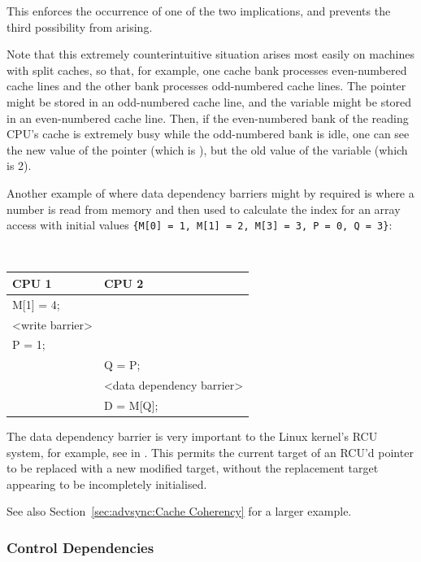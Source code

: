 This enforces the occurrence of one of the two implications, and prevents the
third possibility from arising.

Note that this extremely counterintuitive situation arises most easily on
machines with split caches, so that, for example, one cache bank processes
even-numbered cache lines and the other bank processes odd-numbered cache
lines.
The pointer  might be stored in an odd-numbered cache line, and the
variable  might be stored in an even-numbered cache line.  Then, if the
even-numbered bank of the reading CPU's cache is extremely busy while the
odd-numbered bank is idle, one can see the new value of the
pointer  (which is ),
but the old value of the variable  (which is 2).

Another example of where data dependency barriers might by required is where a
number is read from memory and then used to calculate the index for an array
access with initial values
{\tt \{M[0] = 1, M[1] = 2, M[3] = 3, P = 0, Q = 3\}}:

\vspace{5pt}
\begin{minipage}[t]{\columnwidth}
\tt
\scriptsize
\begin{tabular}{l|p{1.5in}}
	CPU 1 &		CPU 2 \\
	\hline
	M[1] = 4; & \\
	<write barrier> & \\
	P = 1;	&	\\
		&	Q = P; \\
		&	<data dependency barrier> \\
		&	D = M[Q]; \\
\end{tabular}
\end{minipage}
\vspace{5pt}

The data dependency barrier is very important to the Linux kernel's
RCU system, for example,
see  in .
This permits the current
target of an RCU'd pointer to be replaced with a new modified target, without
the replacement target appearing to be incompletely initialised.

See also
Section~\ref{sec:advsync:Cache Coherency}
for a larger example.

\subsubsection{Control Dependencies}
\label{sec:advsync:Control Dependencies}

